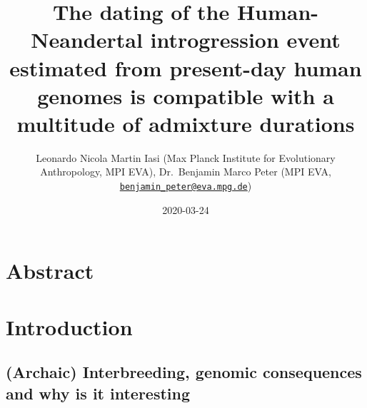 \documentclass[]{article}
\title{The dating of the Human-Neandertal introgression event estimated from present-day human genomes is compatible with a multitude of admixture durations}
\author{Leonardo Nicola Martin Iasi (Max Planck Institute for Evolutionary
Anthropology, MPI EVA), Dr.~Benjamin Marco Peter (MPI EVA,
\href{mailto:benjamin_peter@eva.mpg.de}{\nolinkurl{benjamin\_peter@eva.mpg.de}})}
\date{2020-03-24}
\begin{document}
\maketitle

\section{Abstract}\label{abstract}

\section{Introduction}\label{introduction}



\subsection{(Archaic) Interbreeding, genomic consequences and why is it interesting}\label{(Archaic) Interbreeding, genomic consequences and why is it interesting}
\end{document}
